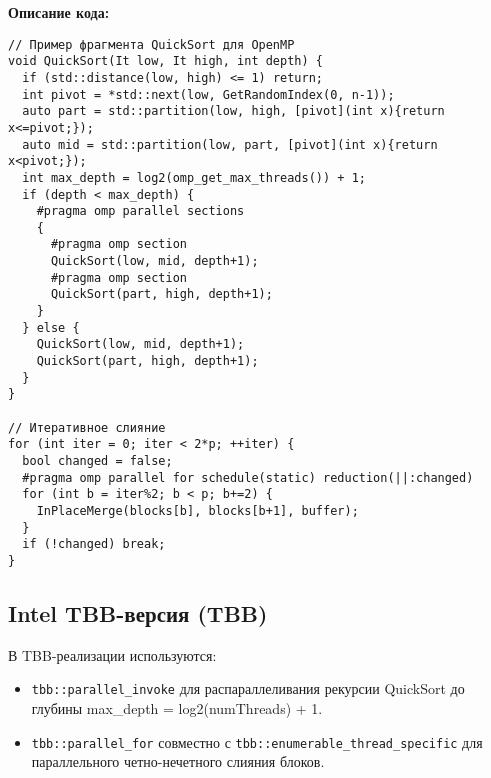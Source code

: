 \documentclass[12pt]{article}
\begin{document}
\noindent\textbf{Описание кода:}
\lstset{language=C++}
\begin{lstlisting}
// Пример фрагмента QuickSort для OpenMP
void QuickSort(It low, It high, int depth) {
  if (std::distance(low, high) <= 1) return;
  int pivot = *std::next(low, GetRandomIndex(0, n-1));
  auto part = std::partition(low, high, [pivot](int x){return x<=pivot;});
  auto mid = std::partition(low, part, [pivot](int x){return x<pivot;});
  int max_depth = log2(omp_get_max_threads()) + 1;
  if (depth < max_depth) {
    #pragma omp parallel sections
    {
      #pragma omp section
      QuickSort(low, mid, depth+1);
      #pragma omp section
      QuickSort(part, high, depth+1);
    }
  } else {
    QuickSort(low, mid, depth+1);
    QuickSort(part, high, depth+1);
  }
}

// Итеративное слияние
for (int iter = 0; iter < 2*p; ++iter) {
  bool changed = false;
  #pragma omp parallel for schedule(static) reduction(||:changed)
  for (int b = iter%2; b < p; b+=2) {
    InPlaceMerge(blocks[b], blocks[b+1], buffer);
  }
  if (!changed) break;
}
\end{lstlisting}

\subsection{Intel TBB-версия (TBB)}
\hspace*{1.25em}В TBB-реализации используются:
\begin{itemize}
    \item \texttt{tbb::parallel\_invoke} для распараллеливания рекурсии QuickSort до глубины max\_depth = log2(numThreads) + 1.
    \item \texttt{tbb::parallel\_for} совместно с \texttt{tbb::enumerable\_thread\_specific} для параллельного четно-нечетного слияния блоков.
\end{itemize}
\end{document}
